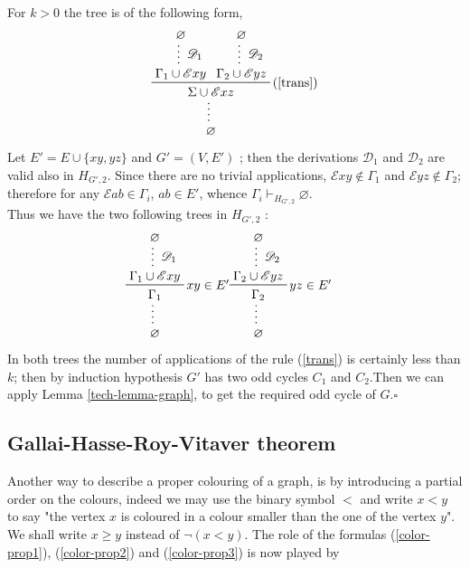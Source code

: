 \documentclass[a4paper,12pt,oneside]{book}
\newcommand{\E}{\mathscr{E}}
\newcommand{\D}{\mathscr{D}}
\newcommand*{\QED}{\hfill\ensuremath{\square}}
\let\emptyset\varnothing
\begin{document}
For $k >0$ the tree is of the following form, 
$$
\prftree[r]{(\ref{trans})}
{\prfsummary[$\D_1$]{\emptyset}{\Gamma_1 \cup \E xy }}
{\prfsummary[$\D_2$]{\emptyset}{\Gamma_2 \cup \E yz }}
{\prfsummary{\Sigma \cup \E xz }{\emptyset}}
$$
Let $E'=E\cup\{xy,yz\}$ and $G'=(V,E' )$ ; then the derivations $\D_1$ and $\D_2$ are valid also in $H_{G',2}$. 
Since there are no trivial applications, $\E xy \notin \Gamma_1 $ and $\E yz \notin \Gamma_2 $; therefore for any $\E ab \in \Gamma_i$, $ab \in E'$, whence $\Gamma_i \vdash_{H_{G',2}} \emptyset$. \\Thus we have the two following trees in  $H_{G',2}$ :
\begin{eqnarray*}
\prfsummary{
\prftree[r]{$xy \in E'$}{\prfsummary[$\D_1$]{\emptyset}{\Gamma_1 \cup \E xy}}{\Gamma_1}}
{\emptyset}
&\prfsummary{
\prftree[r]{$yz \in E'$}{\prfsummary[$\D_2$]{\emptyset}{\Gamma_2 \cup\E yz}}{\Gamma_2}}
{\emptyset}
\end{eqnarray*}
In both trees the number of applications of the rule (\ref{trans}) is certainly less than $k$; then by induction hypothesis $G'$ has two odd cycles $C_1$ and $C_2$.Then we can apply Lemma  \ref{tech-lemma-graph}, to get the required odd cycle of $G$.\QED


\subsection*{Gallai-Hasse-Roy-Vitaver theorem}

Another way to describe a proper colouring of a graph, is by introducing a partial order on the colours, indeed we may use the binary symbol $<$ and write $x<y$ to say "the vertex $x$ is coloured in a colour smaller than the one of the vertex $y$". We shall write $x\geq y $ instead of $\neg (x<y)$. The role of the formulas (\ref{color-prop1}), (\ref{color-prop2}) and (\ref{color-prop3}) is now played by 
\end{document}
